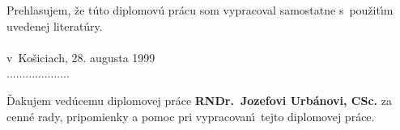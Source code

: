 \begin{titlepage}
\parindent 0cm
\vspace*{8cm}  Prehlasujem, \v ze t\'uto diplomov\'u pr\'acu
som vypracoval samostatne s~pou\v zit\'\i m uvedenej literat\'ury. \\
\\ v~Ko\v siciach, 28. augusta 1999 \\

\hspace{9cm} ....................
\end{titlepage}
\begin{titlepage}
\parindent 0cm
\vspace*{8cm} \v Dakujem ved\'ucemu diplomovej pr\'ace {\bf
RNDr.~Jozefovi Urb\'anovi, CSc.} za cenn\'e rady, pripomienky a pomoc pri
vypracovan\'\i\ tejto diplomovej pr\'ace.
\end{titlepage}
\tableofcontents \newpage 
{}